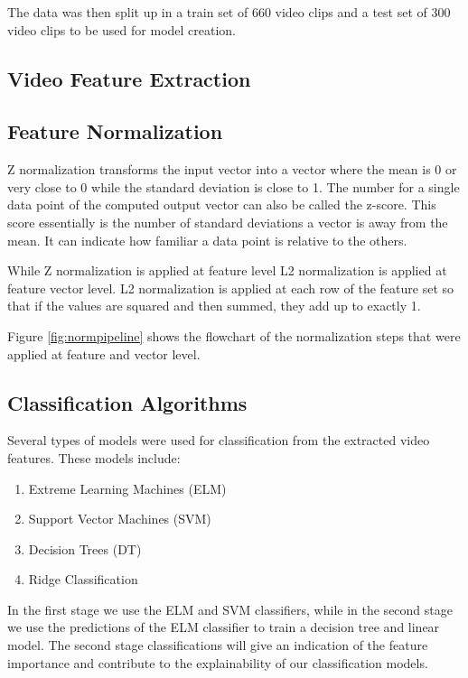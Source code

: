 The data was then split up in a train set of 660 video clips and a test set of 300 video clips to be used for model creation. 

\subsection{Video Feature Extraction}\label{subsection:featureextraction}



\subsection{Feature Normalization}
\label{subsection:normalization}
Z normalization transforms the input vector into a vector where the mean is 0 or very close to 0 while the standard deviation is close to 1. The number for a single data point of the computed output vector can also be called the z-score. This score essentially is the number of standard deviations a vector is away from the mean. It can indicate how familiar a data point is relative to the others. 

\begin{figure*}[h]
  \centering
  
  \caption{Feature normalization pipeline}
  \label{fig:normpipeline}
\end{figure*}

While Z normalization is applied at feature level L2 normalization is applied at feature vector level. L2 normalization is applied at each row of the feature set so that if the values are squared and then summed, they add up to exactly 1. 

Figure \ref{fig:normpipeline} shows the flowchart of the normalization steps that were applied at feature and vector level. 



\subsection{Classification Algorithms}
\label{subsection:classificaiton}
Several types of models were used for classification from the extracted video features. These models include:
\begin{enumerate}
\item Extreme Learning Machines (ELM)
\item Support Vector Machines (SVM)
\item Decision Trees (DT)
\item Ridge Classification
\end{enumerate}
In the first stage we use the ELM and SVM classifiers, while in the second stage we use the predictions of the ELM classifier to train a decision tree and linear model. The second stage classifications will give an indication of the feature importance and contribute to the explainability of our classification models. 

